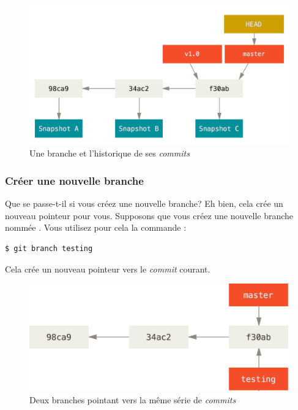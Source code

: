\begin{figure}[H]
  \centering
  \includegraphics{images/branch-and-history}
  \caption{Une branche et l'historique de ses \emph{commits}}
  \label{fig:git:branch-and-history}
\end{figure}

\subsubsection{Créer une nouvelle branche}
\label{sec:git:create_new_branch}

Que se passe-t-il si vous créez une nouvelle branche?
Eh bien, cela crée un nouveau pointeur pour vous.
Supposons que vous créez une nouvelle branche nommée .
Vous utilisez pour cela la commande :
\begin{Schunk}
\begin{Verbatim}
$ git branch testing
\end{Verbatim}
\end{Schunk}

Cela crée un nouveau pointeur vers le \emph{commit} courant.

\begin{figure}[H]
  \centering
  \includegraphics{images/two-branches}
  \caption{Deux branches pointant vers la même série de \emph{commits}}
  \label{fig:git:two-branches}
\end{figure}

